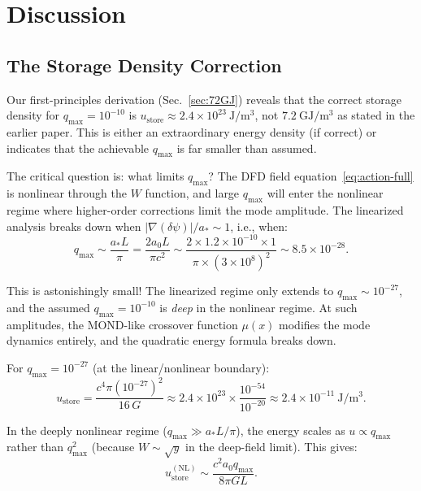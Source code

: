 \documentclass[aps,prd,twocolumn,showpacs,preprintnumbers,superscriptaddress,nofootinbib]{revtex4-2}
\newcommand{\astar}{a_*}
\newcommand{\Wfunc}{W}
\begin{document}
\section{Discussion}\label{sec:discussion}

\subsection{The Storage Density Correction}\label{sec:correction}

Our first-principles derivation (Sec.~\ref{sec:72GJ}) reveals that the
correct storage density for $q_{\max} = 10^{-10}$ is
$u_{\mathrm{store}} \approx 2.4\times 10^{23}~\mathrm{J/m^3}$, not
$7.2~\mathrm{GJ/m^3}$ as stated in the earlier paper.  This is either
an extraordinary energy density (if correct) or indicates that the
achievable $q_{\max}$ is far smaller than assumed.

The critical question is: what limits $q_{\max}$?  The DFD field
equation~\eqref{eq:action-full} is nonlinear through the $\Wfunc$
function, and large $q_{\max}$ will enter the nonlinear regime where
higher-order corrections limit the mode amplitude.  The linearized
analysis breaks down when $|\nabla(\delta\psi)|/\astar \sim 1$, i.e.,
when:
\begin{equation}
q_{\max} \sim \frac{\astar L}{\pi} = \frac{2a_0 L}{\pi c^2}
  \sim \frac{2\times 1.2\times 10^{-10}\times 1}{\pi\times(3\times 10^8)^2}
  \sim 8.5\times 10^{-28}.
\end{equation}

This is astonishingly small!  The linearized regime only extends to
$q_{\max} \sim 10^{-27}$, and the assumed $q_{\max} = 10^{-10}$ is
\emph{deep} in the nonlinear regime.  At such amplitudes, the
MOND-like crossover function $\mu(x)$ modifies the mode dynamics
entirely, and the quadratic energy formula breaks down.

For $q_{\max} = 10^{-27}$ (at the linear/nonlinear boundary):
\begin{equation}
u_{\mathrm{store}} = \frac{c^4\pi(10^{-27})^2}{16\,G}
  \approx 2.4\times 10^{23}\times\frac{10^{-54}}{10^{-20}}
  \approx 2.4\times 10^{-11}~\mathrm{J/m^3}.
\end{equation}

In the deeply nonlinear regime ($q_{\max} \gg \astar L/\pi$), the
energy scales as $u \propto q_{\max}$ rather than $q_{\max}^2$
(because $\Wfunc \sim \sqrt{y}$ in the deep-field limit).  This gives:
\begin{equation}
u_{\mathrm{store}}^{(\mathrm{NL})} \sim \frac{c^2 a_0 q_{\max}}{8\pi G L}.
\end{equation}
\end{document}
